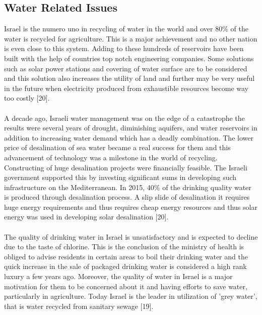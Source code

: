 \documentclass[10pt]{article}
\begin{document}
\subsection{Water Related Issues}
Israel is the numero uno in recycling of water in the world and over 80\% of the water is recycled for agriculture. This is a major achievement and no other nation is even close to this system. Adding to these hundreds of reservoirs have been built with the help of countries top notch engineering companies. Some solutions such as solar power stations and covering of water surface are to be considered and this solution also increases the utility of land and further may be very useful in the future when electricity produced from exhaustible resources become way too costly [20]. 
\\
\\
A decade ago, Israeli water management was on the edge of a catastrophe the results were several years of drought, diminishing aquifers, and water reservoirs in addition to increasing water demand which has a deadly combination. The lower price of desalination of sea water became a real success for them and this advancement of technology was a milestone in the world of recycling. Constructing of huge desalination projects were financially feasible. The Israeli government supported this by investing significant sums in developing such infrastructure on the Mediterranean. In 2015, 40\% of the drinking quality water is produced through desalination process. A slip slide of desalination it requires huge energy requirements and thus requires cheap energy resources and thus solar energy was used in developing solar desalination [20].
\\
\\
The quality of drinking water in Israel is unsatisfactory and is expected to decline due to the taste of chlorine. This is the conclusion of the ministry of health is obliged to advise residents in certain areas to boil their drinking water and the quick increase in the sale of packaged drinking water is considered a high rank luxury a few years ago. Moreover, the quality of water in Israel is a major motivation for them to be concerned about it and having efforts to save water, particularly in agriculture. Today Israel is the leader in utilization of 'grey water', that is water recycled from sanitary sewage [19].
\newpage
\end{document}
